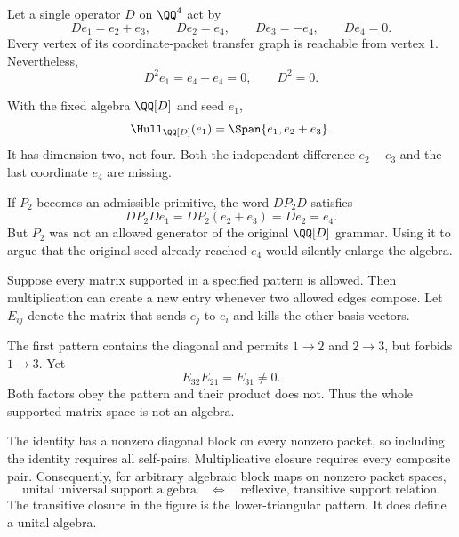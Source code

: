 Let a single operator $D$ on $\QQ^4$ act by
\[
De_1=e_2+e_3,\qquad De_2=e_4,\qquad De_3=-e_4,\qquad De_4=0.
\]
Every vertex of its coordinate-packet transfer graph is reachable from vertex $1$. Nevertheless,
\[
D^2e_1=e_4-e_4=0,\qquad D^2=0.
\]


With the fixed algebra $\QQ[D]$ and seed $e_1$,
\[
\Hull_{\QQ[D]}(e_1)=\Span\{e_1,e_2+e_3\}.
\]
It has dimension two, not four. Both the independent difference $e_2-e_3$ and the last coordinate $e_4$ are missing.

If $P_2$ becomes an admissible primitive, the word $DP_2D$ satisfies
\[
DP_2De_1=DP_2(e_2+e_3)=De_2=e_4.
\]
But $P_2$ was not an allowed generator of the original $\QQ[D]$ grammar. Using it to argue that the original seed already reached $e_4$ would silently enlarge the algebra.


Suppose every matrix supported in a specified pattern is allowed. Then multiplication can create a new entry whenever two allowed edges compose. Let $E_{ij}$ denote the matrix that sends $e_j$ to $e_i$ and kills the other basis vectors.


The first pattern contains the diagonal and permits $1\to2$ and $2\to3$, but forbids $1\to3$. Yet
\[
E_{32}E_{21}=E_{31}\ne0.
\]
Both factors obey the pattern and their product does not. Thus the whole supported matrix space is not an algebra.

The identity has a nonzero diagonal block on every nonzero packet, so including the identity requires all self-pairs. Multiplicative closure requires every composite pair. Consequently, for arbitrary algebraic block maps on nonzero packet spaces,
\[
\boxed{\text{unital universal support algebra}
\quad\Longleftrightarrow\quad
\text{reflexive, transitive support relation}.}
\]
The transitive closure in the figure is the lower-triangular pattern. It does define a unital algebra.

